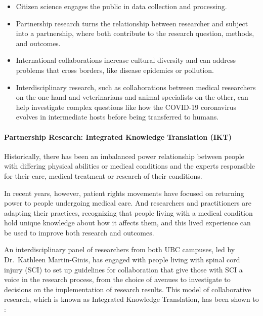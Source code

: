 \documentclass[
]{book}
\providecommand{\tightlist}{%
  \setlength{\itemsep}{0pt}\setlength{\parskip}{0pt}}
\begin{document}
\begin{itemize}
\tightlist
\item
  Citizen science engages the public in data collection and processing.
\item
  Partnership research turns the relationship between researcher and subject into a partnership, where both contribute to the research question, methods, and outcomes.
\item
  International collaborations increase cultural diversity and can address problems that cross borders, like disease epidemics or pollution.
\item
  Interdisciplinary research, such as collaborations between medical researchers on the one hand and veterinarians and animal specialists on the other, can help investigate complex questions like how the COVID-19 coronavirus evolves in intermediate hosts before being transferred to humans.
\end{itemize}

\hypertarget{partnership-research-integrated-knowledge-translation-ikt}{%
\paragraph*{Partnership Research: Integrated Knowledge Translation (IKT)}\label{partnership-research-integrated-knowledge-translation-ikt}}

Historically, there has been an imbalanced power relationship between people with differing physical abilities or medical conditions and the experts responsible for their care, medical treatment or research of their conditions.

In recent years, however, patient rights movements have focused on returning power to people undergoing medical care. And researchers and practitioners are adapting their practices, recognizing that people living with a medical condition hold unique knowledge about how it affects them, and this lived experience can be used to improve both research and outcomes.

An interdisciplinary panel of researchers from both UBC campuses, led by Dr.~Kathleen Martin-Ginis, has engaged with people living with spinal cord injury (SCI) to set up guidelines for collaboration that give those with SCI a voice in the research process, from the choice of avenues to investigate to decisions on the implementation of research results. This model of collaborative research, which is known as Integrated Knowledge Translation, has been shown to \citep{gainforth_integrated_2021}:
\end{document}
